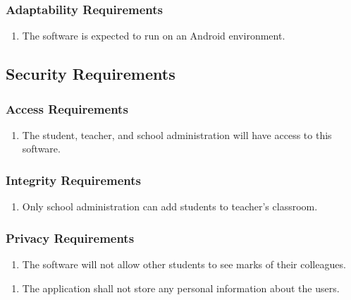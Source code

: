 \documentclass[]{article}
\begin{document}
\subsubsection{Adaptability Requirements}
\label{ssub:adaptability_requirements}
\begin{enumerate}[{MS}1. ]
	\item  The software is expected to run on an Android environment.
\end{enumerate}


\subsection{Security Requirements}
\label{sub:security_requirements}

\subsubsection{Access Requirements}
\label{ssub:access_requirements}
\begin{enumerate}[{SR}1. ]
	\item The student, teacher, and school administration will have access to this software.
\end{enumerate}

\subsubsection{Integrity Requirements}
\label{ssub:integrity_requirements}
\begin{enumerate}[{SR}1. ]
	\item Only school administration can add students
	to teacher's classroom.
\end{enumerate}

\subsubsection{Privacy Requirements}
\label{ssub:privacy_requirements}
\begin{enumerate}[{SR}1. ]
	\item The software will not allow other students to see marks of their colleagues.
\end{enumerate}
\begin{enumerate}[{SR}2. ]
	\item The application shall not store any personal information about the users.
\end{enumerate}
\end{document}
